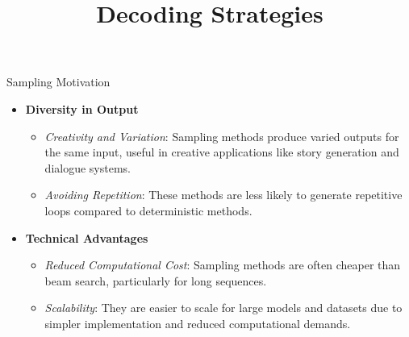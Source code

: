 



\newcommand{\learninggoals}{
\item Get to know different stochastic decoding strategies
\item Learn about sampling with temperature, top-k sampling and top-p (nucleus) sampling
}
\def\myblue#1{\textcolor{texblue}{#1}}

\title{Decoding Strategies}
\date{}




\begin{vbframe}{Sampling Motivation}

\vfill
    
\begin{itemize}
    \item \textbf{Diversity in Output}
    \begin{itemize}
        \item \textit{Creativity and Variation}: Sampling methods produce varied outputs for the same input, useful in creative applications like story generation and dialogue systems.
        \item \textit{Avoiding Repetition}: These methods are less likely to generate repetitive loops compared to deterministic methods.
    \end{itemize}
    \item \textbf{Technical Advantages}
    \begin{itemize}
        \item \textit{Reduced Computational Cost}: Sampling methods are often cheaper than beam search, particularly for long sequences.
        \item \textit{Scalability}: They are easier to scale for large models and datasets due to simpler implementation and reduced computational demands.
    \end{itemize}
\end{itemize}

\vfill

\end{vbframe}


